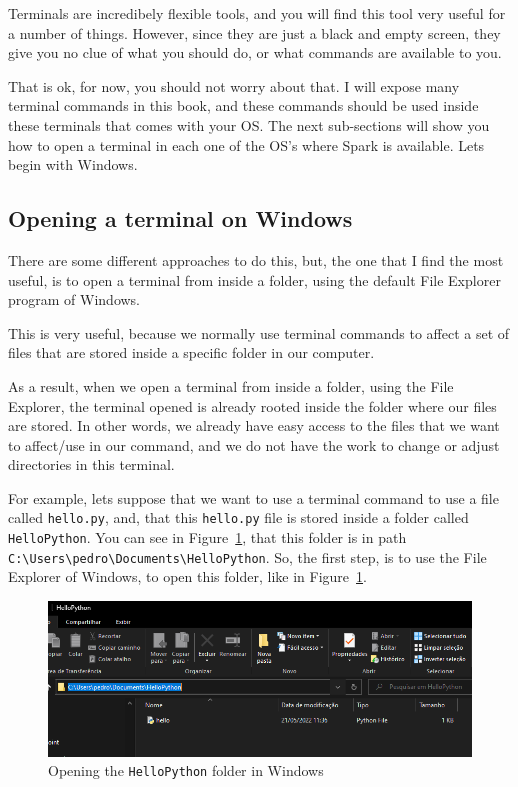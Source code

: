 \documentclass[
  11pt,
  letterpaper,
  DIV=11,
  numbers=noendperiod]{scrreprt}
\begin{document}
Terminals are incredibely flexible tools, and you will find this tool
very useful for a number of things. However, since they are just a black
and empty screen, they give you no clue of what you should do, or what
commands are available to you.

That is ok, for now, you should not worry about that. I will expose many
terminal commands in this book, and these commands should be used inside
these terminals that comes with your OS. The next sub-sections will show
you how to open a terminal in each one of the OS's where Spark is
available. Lets begin with Windows.

\hypertarget{opening-a-terminal-on-windows}{%
\subsection{Opening a terminal on
Windows}\label{opening-a-terminal-on-windows}}

There are some different approaches to do this, but, the one that I find
the most useful, is to open a terminal from inside a folder, using the
default File Explorer program of Windows.

This is very useful, because we normally use terminal commands to affect
a set of files that are stored inside a specific folder in our computer.

As a result, when we open a terminal from inside a folder, using the
File Explorer, the terminal opened is already rooted inside the folder
where our files are stored. In other words, we already have easy access
to the files that we want to affect/use in our command, and we do not
have the work to change or adjust directories in this terminal.

For example, lets suppose that we want to use a terminal command to use
a file called \texttt{hello.py}, and, that this \texttt{hello.py} file
is stored inside a folder called \texttt{HelloPython}. You can see in
Figure~\ref{fig-windows-hello-folder}, that this folder is in path
\texttt{C:\textbackslash{}Users\textbackslash{}pedro\textbackslash{}Documents\textbackslash{}HelloPython}.
So, the first step, is to use the File Explorer of Windows, to open this
folder, like in Figure~\ref{fig-windows-hello-folder}.

\begin{figure}

{\centering \includegraphics{Chapters/../Figures/windows-hello-folder.png}

}

\caption{\label{fig-windows-hello-folder}Opening the
\texttt{HelloPython} folder in Windows}

\end{figure}
\end{document}
